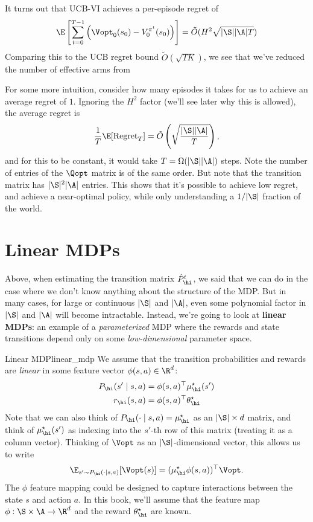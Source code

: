 \documentclass[\main/main]{subfiles}
\begin{document}
It turns out that UCB-VI achieves a per-episode regret of
\[
    \E \left[ \sum_{t=0}^{T-1} \left(\Vopt_0(s_0) - V^{\pi^t}_0(s_0) \right) \right] = \tilde{O}(H^2 \sqrt{|\S| |\A| T})
\]
Comparing this to the UCB regret bound $\tilde{O}(\sqrt{T K})$,
we see that we've reduced the number of effective arms from 

For some more intuition, consider how many episodes it takes for us to achieve an average regret of $1$. Ignoring the $H^2$ factor (we'll see later why this is allowed), the average regret is
\[
    \frac{1}{T} \E[\text{Regret}_T] = \tilde{O}\left(\sqrt{\frac{|\S||\A|}{T}}\right),
\]
and for this to be constant, it would take $T = \Omega(|\S||\A|)$ steps.
Note the number of entries of the $\Qopt$ matrix is of the same order.
But note that the transition matrix has $|\S|^2 |\A|$ entries.
This shows that it's possible to achieve low regret, and achieve a near-optimal policy, while only understanding a $1/|\S|$ fraction of the world.


\section{Linear MDPs}

Above, when estimating the transition matrix $\hat P^t_\hi$, we said that we can do in the case where we don't know anything about the structure of the MDP.
But in many cases, for large or continuous $|\S|$ and $|\A|$, even some polynomial factor in $|\S|$ and $|\A|$ will become intractable.
Instead, we're going to look at \textbf{linear MDPs}: an example of a \emph{parameterized} MDP where the rewards and state transitions depend only on some \emph{low-dimensional} parameter space.

\begin{definition}{Linear MDP}{linear_mdp}
    We assume that the transition probabilities and rewards are \emph{linear} in some feature vector $\phi(s, a) \in \R^d$:
    \begin{align*}
        P_\hi(s' \mid s, a) &= \phi(s, a)^\top \mu^\star_\hi(s') \\
        r_\hi(s, a) &= \phi(s, a)^\top \theta_\hi^\star
    \end{align*}
    Note that we can also think of $P_\hi(\cdot \mid s, a) = \mu_\hi^\star$ as an $|\S| \times d$ matrix, and think of $\mu^\star_\hi(s')$ as indexing into the $s'$-th row of this matrix (treating it as a column vector). Thinking of $\Vopt$ as an $|\S|$-dimensional vector, this allows us to write \[ \E_{s' \sim P_\hi(\cdot \mid s, a)}[\Vopt(s)] = (\mu^\star_\hi \phi(s, a))^\top \Vopt. \]
    The $\phi$ feature mapping could be designed to capture interactions between the state $s$ and action $a$.
    In this book, we'll assume that the feature map $\phi : \S \times \A \to \R^d$ and the reward $\theta_\hi^\star$ are known.
\end{definition}
\end{document}
